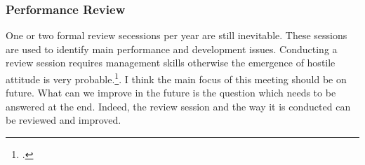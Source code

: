 \subsubsection{Performance Review}
 One or two formal review secessions per year are still inevitable. These sessions are used to identify main performance and development issues. Conducting a review session requires management skills otherwise the emergence of hostile attitude is very probable.\footcite[See][]{Armstrong2006}. I think the main focus of this meeting should be on future. What can we improve in the future is the question which needs to be answered at the end. Indeed, the review session and the way it is conducted can be reviewed and improved.


